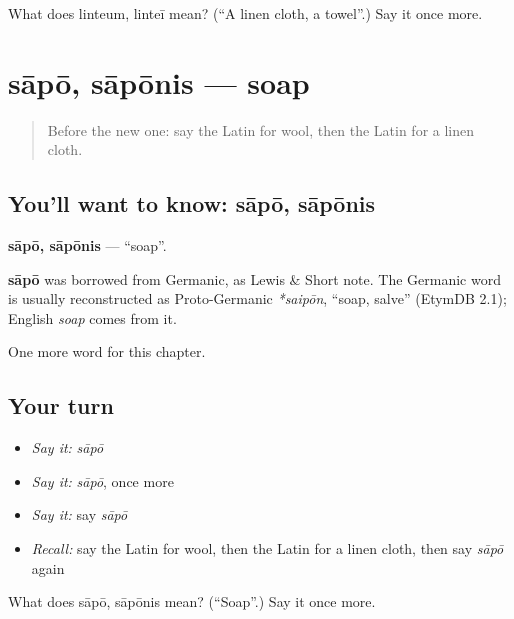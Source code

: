 \begin{tcolorbox}[breakable,colback=teal!4,colframe=teal!35!black,title={Before you move on}]
What does linteum, linteī mean? (\textquotedblleft{}A linen cloth, a towel\textquotedblright{}.) Say it once more.
\end{tcolorbox}
\section[sāpō, sāpōnis]{sāpō, sāpōnis — soap}

\label{lesson:LA-C141-sapo}



\begin{quote}
Before the new one: say the Latin for wool, then the Latin for a linen cloth.
\end{quote}

\subsection*{You'll want to know: sāpō, sāpōnis}
\textbf{sāpō, sāpōnis} — \textquotedblleft{}soap\textquotedblright{}.

\begin{cousinweb}
\textbf{sāpō} was borrowed from Germanic, as Lewis \& Short note. The Germanic word is usually reconstructed as Proto-Germanic \emph{*saipōn}, \textquotedblleft{}soap, salve\textquotedblright{} (EtymDB 2.1); English \emph{soap} comes from it.
\end{cousinweb}

\begin{grammarlens}[title={What you've built}]
One more word for this chapter.
\end{grammarlens}

\subsection*{Your turn}
\begin{itemize}
\raggedright
  \item \emph{Say it:} \emph{sāpō}
  \item \emph{Say it:} \emph{sāpō}, once more
  \item \emph{Say it:} say \emph{sāpō}
  \item \emph{Recall:} say the Latin for wool, then the Latin for a linen cloth, then say \emph{sāpō} again
\end{itemize}

\begin{tcolorbox}[breakable,colback=teal!4,colframe=teal!35!black,title={Before you move on}]
What does sāpō, sāpōnis mean? (\textquotedblleft{}Soap\textquotedblright{}.) Say it once more.
\end{tcolorbox}
